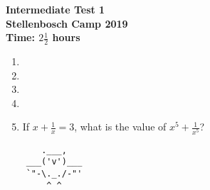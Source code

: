 \documentclass{article}
\begin{document}
\thispagestyle{empty}

\begin{center}
  \textbf{\Large Intermediate Test 1}
  \\ \vspace{1em}
  \textbf{\large Stellenbosch Camp 2019}
  \\ \vspace{1em}
  \textbf{\large Time: $2\frac{1}{2}$ hours}
\end{center}

\vspace{6.81mm}

\begin{enumerate}[1.]

\item %
\vspace{6.81mm}

\item %
\vspace{6.81mm}

\item %
\vspace{6.81mm}

\item %
\vspace{6.81mm}

\item %
If $x + \frac{1}{x} = 3$, what is the value of $x^5 + \frac{1}{x^5}$?\\

\end{enumerate}


\vfill
\begin{center} \begin{BVerbatim}
       .___,   
    ___('v')___
    `"-\._./-"'
        ^ ^ 

\end{BVerbatim} \end{center}
\end{document}
